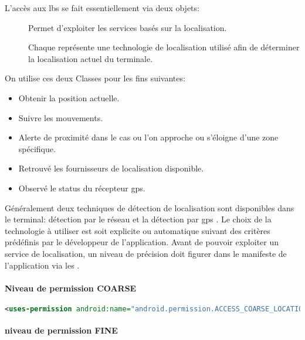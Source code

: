 L'accès aux \gls{lbs} se fait essentiellement via deux objets:
\begin{description}
\item [] Permet d'exploiter les services basés sur la localisation.
\item [] Chaque  représente une technologie de localisation utilisé afin de déterminer la localisation actuel du terminale.

\end{description}
On utilise ces deux Classes pour les fins suivantes:
\begin{itemize}
\item Obtenir la position actuelle.
\item Suivre les mouvements.
\item Alerte de proximité dans le cas ou l'on approche ou s’éloigne d'une zone spécifique.
\item Retrouvé les fournisseurs de localisation disponible.
\item Observé le status du récepteur \gls{gps}.
\end{itemize}

Généralement deux techniques de détection de localisation sont disponibles dans le terminal: détection par le réseau  et la détection par \gls{gps} . Le choix de la technologie à utiliser est soit explicite ou automatique suivant des critères prédéfinis par le développeur de l'application. Avant de pouvoir exploiter un service de localisation, un niveau de précision doit figurer dans le manifeste de l'application via les  .

\paragraph{Niveau de permission \textbf{COARSE} } %
\label{par:coarse}

\begin{lstlisting}[language=xml, caption=permission pour la localisation par le réseau.]
<uses-permission android:name="android.permission.ACCESS_COARSE_LOCATION"/>
\end{lstlisting}

\paragraph{niveau de permission \textbf{FINE} } %
\label{par:fine}


